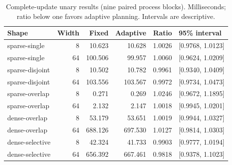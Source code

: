 \begin{table}[ht]
\caption{Complete-update unary results (nine paired process blocks). Milliseconds; ratio below one favors adaptive planning. Intervals are descriptive.}
\label{tab:unary}
\centering\small
\begin{tabular}{@{}lrrrrl@{}}
\toprule
Shape & Width & Fixed & Adaptive & Ratio & 95\% interval \\
\midrule
sparse-single & 8 & 10.623 & 10.628 & 1.0026 & [0.9768, 1.0123] \\
sparse-single & 64 & 100.506 & 99.957 & 1.0060 & [0.9624, 1.0209] \\
sparse-disjoint & 8 & 10.502 & 10.782 & 0.9961 & [0.9340, 1.0409] \\
sparse-disjoint & 64 & 103.556 & 103.567 & 0.9972 & [0.9734, 1.0473] \\
sparse-overlap & 8 & 0.271 & 0.269 & 1.0246 & [0.9672, 1.1895] \\
sparse-overlap & 64 & 2.132 & 2.147 & 1.0018 & [0.9945, 1.0201] \\
dense-overlap & 8 & 53.179 & 53.651 & 1.0019 & [0.9944, 1.0327] \\
dense-overlap & 64 & 688.126 & 697.530 & 1.0127 & [0.9814, 1.0303] \\
dense-selective & 8 & 42.324 & 41.733 & 0.9903 & [0.9777, 1.0194] \\
dense-selective & 64 & 656.392 & 667.461 & 0.9818 & [0.9378, 1.1023] \\
\bottomrule
\end{tabular}
\end{table}
